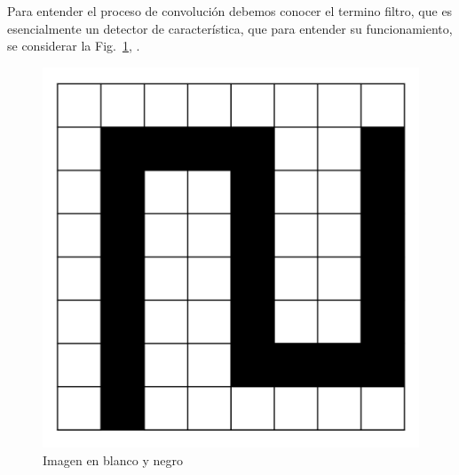     Para entender el proceso de convolución debemos conocer el termino filtro, que es esencialmente un detector de característica, que para entender su funcionamiento, se considerar la Fig.~\ref{fig:image_no_filter}, \cite{dlBook}.
    \begin{figure}[htp]
        \centering
        \includegraphics[scale=0.23]{chapter3/image_no_filter.png}
        \caption{Imagen en blanco y negro}
        \label{fig:image_no_filter}
    \end{figure}

